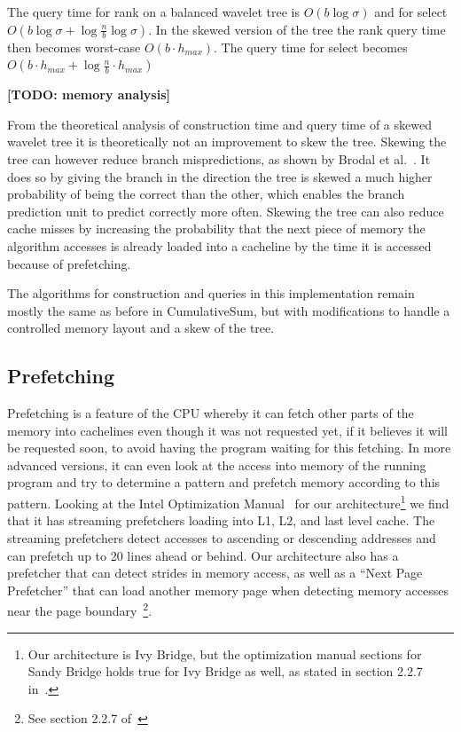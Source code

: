 The query time for rank on a balanced wavelet tree is $O(b \log \sigma)$ and for select $O(b \log \sigma + \log \frac{n}{b} \log \sigma)$.
In the skewed version of the tree the rank query time then becomes worst-case $O(b \cdot h_{max})$. The query time for select becomes $O(b \cdot h_{max} + \log \frac{n}{b} \cdot h_{max})$

\textbf{[TODO: memory analysis]}


From the theoretical analysis of construction time and query time of a skewed wavelet tree it is theoretically not an improvement to skew the tree.
Skewing the tree can however reduce branch mispredictions, as shown by Brodal et al.~.
It does so by giving the branch in the direction the tree is skewed a much higher probability of being the correct than the other, which enables the branch prediction unit to predict correctly more often. 
Skewing the tree can also reduce cache misses by increasing the probability that the next piece of memory the algorithm accesses is already loaded into a cacheline by the time it is accessed because of prefetching.

The algorithms for construction and queries in this implementation remain mostly the same as before in CumulativeSum, but with modifications to handle a controlled memory layout and a skew of the tree.

\subsection{Prefetching}
Prefetching is a feature of the CPU whereby it can fetch other parts of the memory into cachelines even though it was not requested yet, if it believes it will be requested soon, to avoid having the program waiting for this fetching.
In more advanced versions, it can even look at the access into memory of the running program and try to determine a pattern and prefetch memory according to this pattern.
Looking at the Intel Optimization Manual~ for our architecture\footnote{Our architecture is Ivy Bridge, but the optimization manual sections for Sandy Bridge holds true for Ivy Bridge as well, as stated in section 2.2.7 in~.} we find that it has streaming prefetchers loading into L1, L2, and last level cache. The streaming prefetchers detect accesses to ascending or descending addresses and can prefetch up to 20 lines ahead or behind. 
Our architecture also has a prefetcher that can detect strides in memory access, as well as a “Next Page Prefetcher” that can load another memory page when detecting memory accesses near the page boundary~\footnote{See section 2.2.7 of~}.


